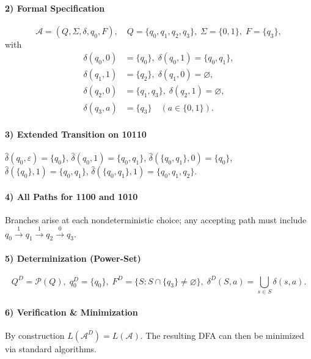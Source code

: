 \documentclass{article}
\theoremstyle{theorem}
\theoremstyle{definition}
\theoremstyle{remark}
\begin{document}
\paragraph{2) Formal Specification}  
\[
\mathcal{A} = (Q,\Sigma,\delta,q_0,F),
\quad
Q=\{q_0,q_1,q_2,q_3\},\;\Sigma=\{0,1\},\;F=\{q_3\},
\]
with
\[
\begin{aligned}
\delta(q_0,0)&=\{q_0\},\;\delta(q_0,1)=\{q_0,q_1\},\\
\delta(q_1,1)&=\{q_2\},\;\delta(q_1,0)=\varnothing,\\
\delta(q_2,0)&=\{q_1,q_3\},\;\delta(q_2,1)=\varnothing,\\
\delta(q_3,a)&=\{q_3\}\quad(a\in\{0,1\}).
\end{aligned}
\]

\paragraph{3) Extended Transition on 10110}  
\(\hat{\delta}(q_0,\varepsilon)=\{q_0\}\),  
\(\hat{\delta}(q_0,1)=\{q_0,q_1\}\),  
\(\hat{\delta}(\{q_0,q_1\},0)=\{q_0\}\),  
\(\hat{\delta}(\{q_0\},1)=\{q_0,q_1\}\),  
\(\hat{\delta}(\{q_0,q_1\},1)=\{q_0,q_1,q_2\}\).

\paragraph{4) All Paths for 1100 and 1010}  
Branches arise at each nondeterministic choice; any accepting path must include  
\(q_0\xrightarrow{1}q_1\xrightarrow{1}q_2\xrightarrow{0}q_3\).


\paragraph{5) Determinization (Power-Set)}  
\[
Q^D=\mathcal{P}(Q),\;
q_0^D=\{q_0\},\;
F^D=\{S:S\cap\{q_3\}\neq\varnothing\},\;
\delta^D(S,a)=\bigcup_{s\in S}\delta(s,a).
\]


\paragraph{6) Verification \& Minimization}  
By construction \(L(\mathcal{A}^D)=L(\mathcal{A})\). The resulting DFA can then be minimized via standard algorithms.
\end{document}
